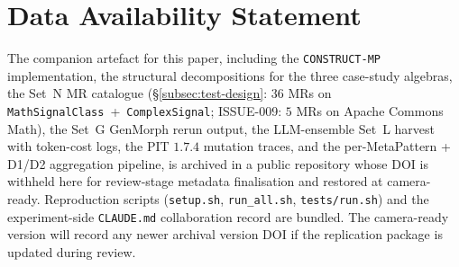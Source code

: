 \documentclass[acmsmall,screen,review]{acmart}
\begin{document}
\section*{Data Availability Statement}
The companion artefact for this paper, including the
\texttt{CONSTRUCT-MP} implementation, the structural decompositions for
the three case-study algebras, the Set~N MR catalogue
(\S\ref{subsec:test-design}: $36$ MRs on \texttt{MathSignalClass}~+~\texttt{ComplexSignal};
ISSUE-009: $5$ MRs on Apache Commons Math), the Set~G GenMorph rerun
output, the LLM-ensemble Set~L harvest with token-cost logs, the
PIT $1.7.4$ mutation traces, and the per-MetaPattern + D1/D2 aggregation
pipeline, is archived in a public repository whose DOI is withheld here for
review-stage metadata finalisation and restored at camera-ready.
Reproduction scripts (\texttt{setup.sh}, \texttt{run\_all.sh},
\texttt{tests/run.sh}) and the experiment-side \texttt{CLAUDE.md}
collaboration record are bundled. The camera-ready version will record any
newer archival version DOI if the replication package is updated during review.
\end{document}

